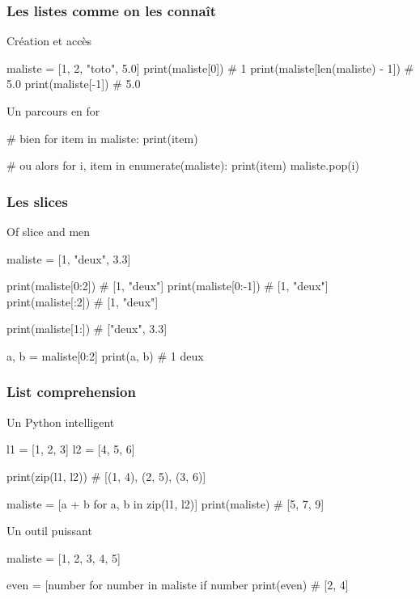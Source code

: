 \documentclass{beamer}
\begin{document}
\begin{frame}[fragile]
  \frametitle{Les listes comme on les connaît}

  \begin{block}{Création et accès}
    \begin{python}
maliste = [1, 2, "toto", 5.0]
print(maliste[0]) # 1
print(maliste[len(maliste) - 1]) # 5.0
print(maliste[-1]) # 5.0
    \end{python}
  \end{block}

  \pause

  \begin{block}{Un parcours en for}
    \begin{python}
# bien
for item in maliste:
  print(item)

# ou alors
for i, item in enumerate(maliste):
  print(item)
  maliste.pop(i)
    \end{python}
  \end{block}

\end{frame}


\begin{frame}[fragile]
  \frametitle{Les slices}
  \begin{block}{Of slice and men}
    \begin{python}
maliste = [1, "deux", 3.3]

print(maliste[0:2]) # [1, "deux"]
print(maliste[0:-1]) # [1, "deux"]
print(maliste[:2]) # [1, "deux"]

print(maliste[1:]) # ["deux", 3.3]

a, b = maliste[0:2]
print(a, b) # 1 deux
    \end{python}
  \end{block}
\end{frame}

\begin{frame}[fragile]
  \frametitle{List comprehension}

  \begin{block}{Un Python intelligent}
    \begin{python}
l1 = [1, 2, 3]
l2 = [4, 5, 6]

print(zip(l1, l2)) # [(1, 4), (2, 5), (3, 6)]

maliste = [a + b for a, b in zip(l1, l2)]
print(maliste) # [5, 7, 9]
    \end{python}
  \end{block}

  \pause

  \begin{block}{Un outil puissant}
    \small
    \begin{python}
maliste = [1, 2, 3, 4, 5]

even = [number for number in maliste
               if number %
print(even) # [2, 4]
    \end{python}
    
  \end{block}
\end{frame}
\end{document}
